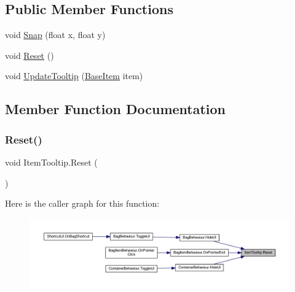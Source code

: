 \subsection*{Public Member Functions}
\begin{DoxyCompactItemize}
\item 
void \mbox{\hyperlink{class_item_tooltip_ae6eb8ab5acd326e431e46a3df5b76fa4}{Snap}} (float x, float y)
\item 
void \mbox{\hyperlink{class_item_tooltip_a4db0f30912c9b31ac912dbac40b17185}{Reset}} ()
\item 
void \mbox{\hyperlink{class_item_tooltip_a51e15cd0c208c14105cc8bedf452385b}{Update\+Tooltip}} (\mbox{\hyperlink{class_base_item}{Base\+Item}} item)
\end{DoxyCompactItemize}


\subsection{Member Function Documentation}
\mbox{\label{class_item_tooltip_a4db0f30912c9b31ac912dbac40b17185}} 
\subsubsection{\texorpdfstring{Reset()}{Reset()}}
{\footnotesize\ttfamily void Item\+Tooltip.\+Reset (\begin{DoxyParamCaption}{ }\end{DoxyParamCaption})}

Here is the caller graph for this function\+:\nopagebreak
\begin{figure}[H]
\begin{center}
\leavevmode
\includegraphics[width=350pt]{class_item_tooltip_a4db0f30912c9b31ac912dbac40b17185_icgraph}
\end{center}
\end{figure}
\mbox{\label{class_item_tooltip_ae6eb8ab5acd326e431e46a3df5b76fa4}} 
